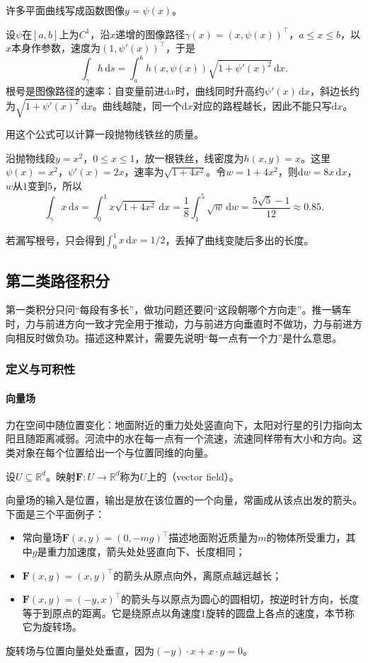 许多平面曲线写成函数图像$y=\psi(x)$。

设$\psi$在$[a,b]$上为$C^1$，沿$x$递增的图像路径$\gamma(x)=(x,\psi(x))^\top$，$a\leq x\leq b$，以$x$本身作参数，速度为$(1,\psi'(x))^\top$，于是
\[
 \int_\gamma h\,\mathrm ds
 =\int_a^b h(x,\psi(x))\sqrt{1+\psi'(x)^2}\,\mathrm dx.
\]
根号是图像路径的速率：自变量前进$\mathrm dx$时，曲线同时升高约$\psi'(x)\,\mathrm dx$，斜边长约为$\sqrt{1+\psi'(x)^2}\,\mathrm dx$。曲线越陡，同一个$\mathrm dx$对应的路程越长，因此不能只写$\mathrm dx$。

用这个公式可以计算一段抛物线铁丝的质量。
\begin{example}[抛物线铁丝的质量]
沿抛物线段$y=x^2$，$0\leq x\leq1$，放一根铁丝，线密度为$h(x,y)=x$。这里$\psi(x)=x^2$，$\psi'(x)=2x$，速率为$\sqrt{1+4x^2}$。令$w=1+4x^2$，则$\mathrm dw=8x\,\mathrm dx$，$w$从$1$变到$5$，所以
\[
 \int_\gamma x\,\mathrm ds=\int_0^1x\sqrt{1+4x^2}\,\mathrm dx
 =\frac18\int_1^5\sqrt w\,\mathrm dw=\frac{5\sqrt5-1}{12}\approx0.85.
\]
\end{example}
若漏写根号，只会得到$\int_0^1x\,\mathrm dx=1/2$，丢掉了曲线变陡后多出的长度。

\subsection{第二类路径积分}

第一类积分只问“每段有多长”，做功问题还要问“这段朝哪个方向走”。推一辆车时，力与前进方向一致才完全用于推动，力与前进方向垂直时不做功，力与前进方向相反时做负功。描述这种累计，需要先说明“每一点有一个力”是什么意思。

\subsubsection{定义与可积性}

\paragraph{向量场}

力在空间中随位置变化：地面附近的重力处处竖直向下，太阳对行星的引力指向太阳且随距离减弱。河流中的水在每一点有一个流速，流速同样带有大小和方向。这类对象在每个位置给出一个与位置同维的向量。
\begin{definition}[向量场]
设$U\subseteq\mathbb R^d$。映射$\bm F:U\to\mathbb R^d$称为$U$上的（vector field）。
\end{definition}

向量场的输入是位置，输出是放在该位置的一个向量，常画成从该点出发的箭头。下面是三个平面例子：
\begin{itemize}
 \item 常向量场$\bm F(x,y)=(0,-mg)^\top$描述地面附近质量为$m$的物体所受重力，其中$g$是重力加速度，箭头处处竖直向下、长度相同；
 \item $\bm F(x,y)=(x,y)^\top$的箭头从原点向外，离原点越远越长；
 \item $\bm F(x,y)=(-y,x)^\top$的箭头与以原点为圆心的圆相切，按逆时针方向，长度等于到原点的距离。它是绕原点以角速度$1$旋转的圆盘上各点的速度，本节称它为旋转场。
\end{itemize}
旋转场与位置向量处处垂直，因为$(-y)\cdot x+x\cdot y=0$。

